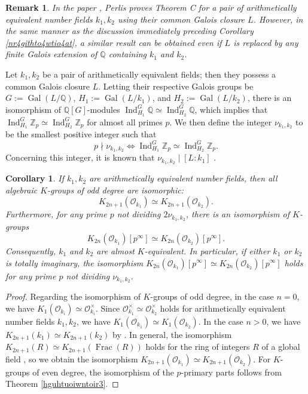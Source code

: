 \documentclass{article}
\numberwithin{equation}{section} %
\newtheorem{cor}[lemm]{Corollary}
\newtheorem{rem}{Remark}
\begin{document}
    \begin{rem}
  In the paper \cite{Perlis2}, Perlis proves Theorem C for a pair of arithmetically equivalent number fields $k_1, k_2$ using their common Galois closure $L$. However, in the same manner as the discussion immediately preceding Corollary \ref{nr4githto4wtio4at}, a similar result can be obtained even if $L$ is replaced by any finite Galois extension of $\mathbb{Q}$ containing $k_1$ and $k_2$.
\end{rem}


Let $k_1, k_2$ be a pair of arithmetically equivalent fields; then they possess a common Galois closure $L$. Letting their respective Galois groups be $G := \operatorname{Gal}(L/\mathbb{Q})$, $H_1 := \operatorname{Gal}(L/k_1)$, and $H_2 := \operatorname{Gal}(L/k_2)$, there is an isomorphism of $\mathbb{Q}[G]$-modules $\operatorname{Ind}_{H_1}^G\mathbb{Q} \simeq \operatorname{Ind}_{H_2}^G\mathbb{Q}$, which implies that $\operatorname{Ind}_{H_1}^G \mathbb{Z}_p \simeq \operatorname{Ind}_{H_2}^G\mathbb{Z}_p$ for almost all primes $p$. We then define the integer $\nu_{k_1,k_2}$ to be the smallest positive integer such that
\[
  p \nmid \nu_{k_1,k_2} \iff \operatorname{Ind}_{H_1}^G \mathbb{Z}_p \simeq \operatorname{Ind}_{H_2}^G\mathbb{Z}_p.
\]
Concerning this integer, it is known that $\nu_{k_1,k_2} \mid [L:k_1]$ \cite[Theorem 1]{Perlis2}.

\begin{cor}
  \label{wengrtuan3oin}
  If $k_1, k_2$ are arithmetically equivalent number fields, then all algebraic $K$-groups of odd degree are isomorphic:
  \[
    K_{2n+1}(\mathcal{O}_{k_1}) \simeq K_{2n+1}(\mathcal{O}_{k_2}).
  \]
  Furthermore, for any prime $p$ not dividing $2\nu_{k_1,k_2}$, there is an isomorphism of $K$-groups
  \[
    K_{2n}(\mathcal{O}_{k_1})[p^\infty] \simeq K_{2n}(\mathcal{O}_{k_2})[p^\infty].
  \]
  Consequently, $k_1$ and $k_2$ are almost $K$-equivalent. In particular, if either $k_1$ or $k_2$ is totally imaginary, the isomorphism $K_{2n}(\mathcal{O}_{k_1})[p^\infty] \simeq K_{2n}(\mathcal{O}_{k_2})[p^\infty]$ holds for any prime $p$ not dividing $\nu_{k_1,k_2}$.
\end{cor}

\begin{proof}
  Regarding the isomorphism of $K$-groups of odd degree, in the case $n = 0$, we have $K_1(\mathcal{O}_{k_i}) \simeq \mathcal{O}_{k_i}^\times$. Since $\mathcal{O}_{k_1}^\times \simeq \mathcal{O}_{k_2}^\times$ holds for arithmetically equivalent number fields $k_1, k_2$, we have $K_1(\mathcal{O}_{k_1}) \simeq K_1(\mathcal{O}_{k_2})$. In the case $n > 0$, we have $K_{2n+1}(k_1) \simeq K_{2n+1}(k_2)$ by \cite[Proposition 1.7]{Phagan}. In general, the isomorphism $K_{2n+1}(R) \simeq K_{2n+1}(\operatorname{Frac}(R))$ holds for the ring of integers $R$ of a global field \cite[Theorem 7]{Weibel3}, so we obtain the isomorphism $K_{2n+1}(\mathcal{O}_{k_1}) \simeq K_{2n+1}(\mathcal{O}_{k_2})$. For $K$-groups of even degree, the isomorphism of the $p$-primary parts follows from Theorem \ref{hguhtuoiwntoir3}.
\end{proof}
        
\end{document}

